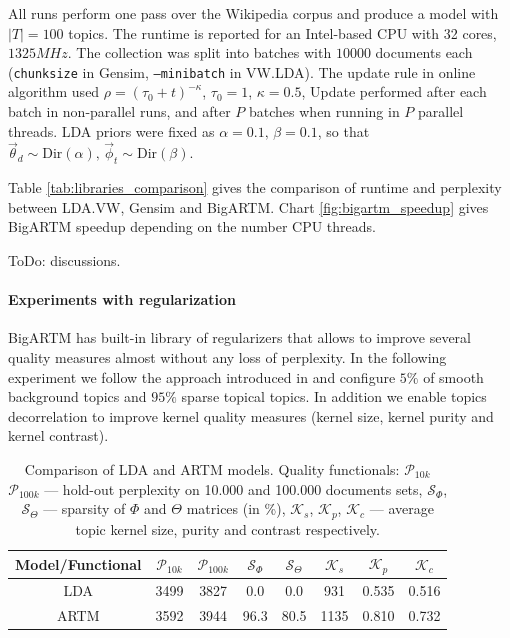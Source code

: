 \documentclass{llncs}
\begin{document}
All runs perform one pass over the Wikipedia corpus and produce a model with $|T|=100$ topics.
The runtime is reported for an Intel-based CPU with 32 cores, $1325 MHz$.
The collection was split into batches with $10 000$ documents each
(\texttt{chunksize} in Gensim, \texttt{--minibatch} in VW.LDA).
The update rule in online algorithm used $\rho = (\tau_0 + t)^{-\kappa}$, $\tau_0 = 1$, $\kappa = 0.5$,
Update performed after each batch in non-parallel runs, and after $P$ batches when running in $P$ parallel threads.
LDA priors were fixed as $\alpha = 0.1,\, \beta = 0.1$, so that $\vec{\theta}_d \sim \text{Dir}(\alpha),\, \vec{\phi}_t \sim \text{Dir}(\beta)$.

Table \ref{tab:libraries_comparison} gives the comparison of runtime and perplexity between LDA.VW, Gensim and BigARTM.
Chart \ref{fig:bigartm_speedup} gives BigARTM speedup depending on the number CPU threads.

{\color{red}ToDo: discussions.}

\paragraph{Experiments with regularization}

BigARTM has built-in library of regularizers that allows to improve several quality measures almost without any loss of perplexity.
In the following experiment we follow the approach introduced in \cite{voron14aist} and configure $5\%$ of smooth background topics 
and $95\%$ sparse topical topics. In addition we enable topics decorrelation to improve kernel quality measures
(kernel size, kernel purity and kernel contrast).
    
\begin{table}[t]
\centering
\begin{tabular}[t]{||c||ccccccc||}
\hline
Model/Functional & $\mathcal{P}_{10k}$ & $\mathcal{P}_{100k}$ &  $\mathcal{S}_{\Phi}$ & $\mathcal{S}_{\Theta}$ &  $\mathcal{K}_{s}$ & $\mathcal{K}_{p}$ &  $\mathcal{K}_{c}$ \\
\hline
LDA              & 3499 & 3827 & 0.0  & 0.0  & 931  & 0.535 & 0.516 \\
ARTM             & 3592 & 3944 & 96.3 & 80.5 & 1135 & 0.810 & 0.732 \\
\hline
\end{tabular}
\caption{Comparison of LDA and ARTM models. 
Quality functionals: $\mathcal{P}_{10k}$ $\mathcal{P}_{100k}$ --- hold-out perplexity on 10.000 and 100.000 documents sets,
$\mathcal{S}_{\Phi}$, $\mathcal{S}_{\Theta}$ --- sparsity of $\Phi$ and $\Theta$ matrices (in \%),
$\mathcal{K}_{s}$, $\mathcal{K}_{p}$, $\mathcal{K}_{c}$ --- average topic kernel size, purity and contrast respectively.}
\label{tab:model_comparison}
\end{table}
\end{document}
